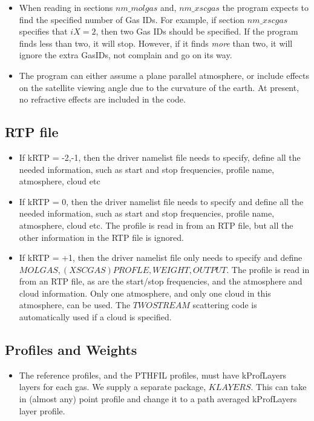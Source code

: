 \documentclass[12pt]{article}
\begin{document}
{{{\begin{itemize}
\item When reading in sections $nm\_molgas$ and, $nm\_xscgas$ the program
  expects to find the specified number of Gas IDs.  For example, if
  section $nm\_xscgas$ specifies that $iX = 2$, then two Gas IDs should
  be specified.  If the program finds less than two, it will stop.
  However, if it finds {\em more} than two, it will ignore the extra
  GasIDs, not complain and go on its way.
  
\item The program can either assume a plane parallel atmosphere, or
  include effects on the satellite viewing angle due to the curvature
  of the earth.  At present, no refractive effects are included in the
  code.
\end{itemize}

\subsection{RTP file}
\begin{itemize}
\item If kRTP = -2,-1, then the driver namelist file needs to specify, define
      all the needed information, such as start and stop frequencies, profile 
      name, atmosphere, cloud etc
\item If kRTP = 0, then the driver namelist file needs to specify and define
      all the needed information, such as start and stop frequencies, profile 
      name, atmosphere, cloud etc. The profile is read in from an RTP file, but
      all the other information in the RTP file is ignored.
\item If kRTP = +1, then the driver namelist file only needs to specify and 
      define $MOLGAS, (XSCGAS) PROFLE, WEIGHT, OUTPUT$. The profile is read 
      in from an RTP file, as are the start/stop frequencies, and the
      atmosphere and cloud information. Only one atmosphere, and only one cloud
      in this atmosphere, can be used. The $TWOSTREAM$ scattering code is
      automatically used if a cloud is specified. 
\end{itemize}

\subsection{Profiles and Weights}

\begin{itemize}
\item The reference profiles, and the PTHFIL profiles, must have kProfLayers
  layers for each gas.  We supply a separate package, $KLAYERS$. This can 
  take in (almost any) point profile and change it to a path averaged 
  kProfLayers layer profile.
  

\end{itemize}}}}
\end{document}
